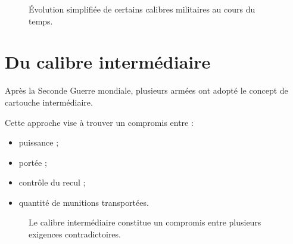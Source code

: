 \begin{figure}[htbp]
\centering


\caption{Évolution simplifiée de certains calibres militaires au cours du temps.}
\label{fig:evolution_calibres_militaires}

\end{figure}

\section{Du calibre intermédiaire}

Après la Seconde Guerre mondiale, plusieurs armées ont adopté le concept de
cartouche intermédiaire.

Cette approche vise à trouver un compromis entre :

\begin{itemize}
    \item puissance ;
    \item portée ;
    \item contrôle du recul ;
    \item quantité de munitions transportées.
\end{itemize}

\begin{figure}[htbp]
\centering


\caption{Le calibre intermédiaire constitue un compromis entre plusieurs exigences contradictoires.}
\label{fig:calibre_intermediaire}

\end{figure}

